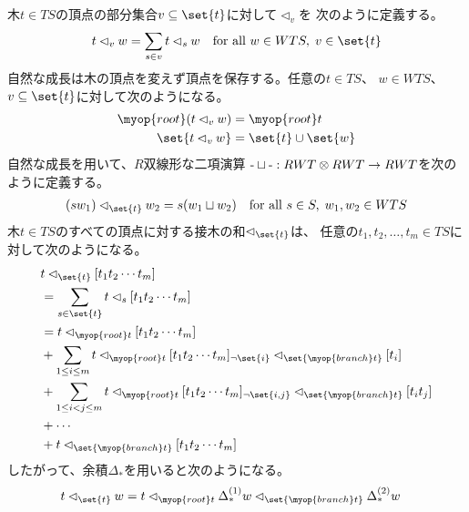 	木$t\in TS$の頂点の部分集合$v\subseteq \set{t}$に対して$\lhd_v$を
	次のように定義する。
	\begin{equation}\begin{split} %
		t\lhd_v w = \sum_{s\in v} t\lhd_s w 
		\quad\text{for all }w\in WTS,\; v\in \set{t}
	\end{split}\end{equation} %
	自然な成長は木の頂点を変えず頂点を保存する。任意の$t\in TS$、
	$w\in WTS$、$v\subseteq \set{t}$に対して次のようになる。
	\begin{equation*}\begin{split} %
		\myop{root}(t\lhd_{v} w) &= \myop{root}t \\
		\set{t\lhd_{v} w} &= \set{t}\cup \set{w} \\
	\end{split}\end{equation*} %
	自然な成長を用いて、$R$双線形な二項演算
	$\mathchar`-\sqcup\mathchar`-:RWT\otimes RWT\to RWT$を次のように定義する。
	\begin{equation}\begin{split} %
		(sw_1)\lhd_{\set{t}} w_2 = s(w_1\sqcup w_2) \quad\text{for all }s\in S,\;w_1,w_2\in WTS \\
	\end{split}\end{equation} %
	木$t\in TS$のすべての頂点に対する接木の和$\lhd_{\set{t}}$は、
	任意の$t_1,t_2,\dots,t_m\in TS$に対して次のようになる。
	\begin{equation*}\begin{split} %
		&t\lhd_{\set{t}}[t_1t_2\cdots t_m] \\
		&= \sum_{s\in \set{t}}t\lhd_s[t_1t_2\cdots t_m] \\
		&= t\lhd_{\myop{root}t}[t_1t_2\cdots t_m] \\
		&+ \sum_{1\le i\le m}t\lhd_{\myop{root}t}[t_1t_2\cdots t_m]_{\neg\set{i}}\lhd_{\set{\myop{branch}t}}[t_i] \\
		&+ \sum_{1\le i<j\le m}t\lhd_{\myop{root}t}[t_1t_2\cdots t_m]_{\neg\set{i,j}}\lhd_{\set{\myop{branch}t}}[t_it_j] \\
		&+ \cdots \\
		&+ t\lhd_{\set{\myop{branch}t}}[t_1t_2\cdots t_m] \\
	\end{split}\end{equation*} %
	したがって、余積$\Delta_*$を用いると次のようになる。
	\begin{equation*}\begin{split} %
		t\lhd_{\set{t}} w &= t\lhd_{\myop{root}t}\Delta_*^{(1)}w\lhd_{\set{\myop{branch}t}}\Delta_*^{(2)}w
	\end{split}\end{equation*} %

